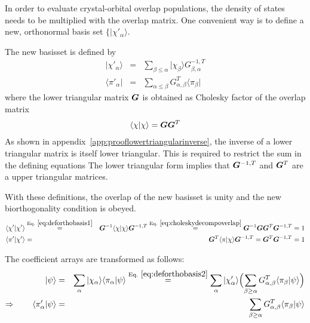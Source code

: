 \documentclass[11pt,a4paper]{report}
\begin{document}
In order to evaluate crystal-orbital overlap populations, the density
of states needs to be multiplied with the overlap matrix. One
convenient way is to define a new, orthonormal basis set
$\{|\chi'_\alpha\rangle$.

The new basisset is defined by
\begin{eqnarray}
|\chi'_\alpha\rangle&=&\sum_{\beta\le\alpha}|\chi_\beta\rangle G^{-1,T}_{\beta,\alpha}
\label{eq:deforthobasis1}
\\
\langle\pi'_\alpha|&=&\sum_{\alpha\le\beta} G^{T}_{\alpha,\beta}\langle\pi_\beta|
\label{eq:deforthobasis2}
\end{eqnarray}
where the lower triangular matrix $\bm{G}$ is obtained as Cholesky
factor of the overlap matrix
\begin{eqnarray}
\langle\chi|\chi\rangle=\bm{G} \bm{G}^T
\label{eq:choleskydecompoverlap}
\end{eqnarray}
As shown in appendix~\ref{app:prooflowertriangularinverse}, the
inverse of a lower triangular matrix is itself lower triangular. This
is required to restrict the sum in the defining equations
The lower triangular form implies that $\bm{G}^{-1,T}$ and
$\bm{G}^T$ are a upper triangular matrices.

With these definitions, the overlap of the new basisset is unity and
the new biorthogonality condition is obeyed.
\begin{eqnarray}
\langle\chi'|\chi'\rangle 
&\eqrel{eq:deforthobasis1}{=}&
\mat{G}^{-1}\langle\chi|\chi\rangle\mat{G}^{-1,T}
\eqrel{eq:choleskydecompoverlap}{=}
\mat{G}^{-1}\mat{G}\mat{G}^T
\mat{G}^{-1,T}=1 
\nonumber\\ 
%
\langle\pi'|\chi'\rangle
&=&\mat{G}^{T}\langle\pi|\chi\rangle \mat{G}^{-1,T}
=\mat{G}^{T}\mat{G}^{-1,T}=1
\end{eqnarray}

The coefficient arrays are transformed as follows:
\begin{eqnarray}
|\psi\rangle
&=&
\sum_\alpha|\chi_\alpha\rangle\langle\pi_\alpha|\psi\rangle
\eqrel{eq:deforthobasis2}{=}
\sum_\alpha|\chi'_\alpha\rangle
\Bigl(\sum_{\beta\ge\alpha} G^T_{\alpha,\beta}\langle\pi_\beta|\psi\rangle\Bigr)
\nonumber\\
\Rightarrow\qquad
\langle\pi'_\alpha|\psi\rangle
&=&
\sum_{\beta\ge\alpha} G^T_{\alpha,\beta}\langle\pi_\beta|\psi\rangle
\end{eqnarray}





\end{document}
